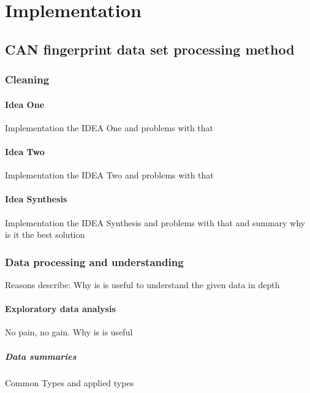 \chapter{Implementation}
\section{CAN fingerprint data set processing method}
\subsection{Cleaning}
		\subsubsection{Idea One}
		Implementation the IDEA One and problems with that
		\subsubsection{Idea Two}
		Implementation the IDEA Two and problems with that
		\subsubsection{Idea Synthesis}
		Implementation the IDEA Synthesis and problems with that and summary why is it the best solution
\subsection{Data processing and understanding}
		Reasons describe: Why is is useful to understand the given data in depth
	\subsubsection{Exploratory data analysis}
		No pain, no gain. Why is is useful
		\paragraph{Data summaries}
		Common Types and applied types
